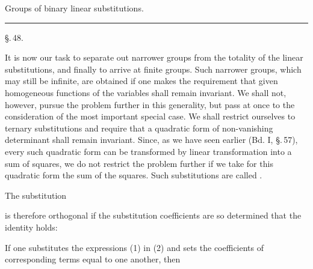 
\begin{center}

Groups of binary linear substitutions.

\rule{4cm}{0.4pt}

\S.\,48.

\end{center}

It is now our task to separate out narrower groups from the
totality of the linear substitutions, and finally to arrive at
finite groups. Such narrower groups, which may still be infinite,
are obtained if one makes the requirement that given homogeneous
functions of the variables shall remain invariant. We shall not,
however, pursue the problem further in this generality, but pass
at once to the consideration of the most important special case.
We shall restrict ourselves to ternary substitutions and require
that a quadratic form of non-vanishing determinant shall remain
invariant. Since, as we have seen earlier (Bd. I, \S.\,57), every
such quadratic form can be transformed by linear transformation
into a sum of squares, we do not restrict the problem further if
we take for this quadratic form the sum of the squares. Such
substitutions are called .

The substitution


is therefore orthogonal if the substitution coefficients are so determined that the identity holds:


If one substitutes the expressions (1) in (2) and sets the
coefficients of corresponding terms equal to one another, then

